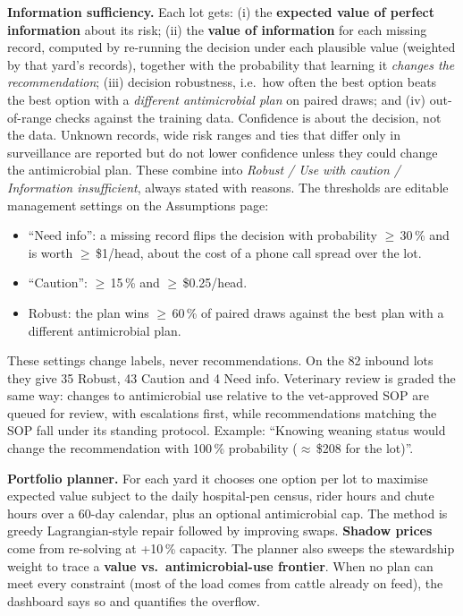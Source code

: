 \documentclass[10pt,letterpaper]{article}
\newcommand{\pct}{\,\%}
\newcommand{\usd}[1]{\$#1}
\newcommand{\lead}[1]{\textbf{#1}\enspace}
\begin{document}
\lead{Information sufficiency.} Each lot gets: (i) the \textbf{expected value of perfect information} about its risk; (ii) the \textbf{value of information} for each missing record, computed by re-running the decision under each plausible value (weighted by that yard's records), together with the probability that learning it \emph{changes the recommendation}; (iii) decision robustness, i.e.\ how often the best option beats the best option with a \emph{different antimicrobial plan} on paired draws; and (iv) out-of-range checks against the training data. Confidence is about the decision, not the data. Unknown records, wide risk ranges and ties that differ only in surveillance are reported but do not lower confidence unless they could change the antimicrobial plan. These combine into \emph{Robust / Use with caution / Information insufficient}, always stated with reasons. The thresholds are editable management settings on the Assumptions page:
\begin{itemize}
  \item ``Need info'': a missing record flips the decision with probability $\geq$\,30\pct{} and is worth $\geq$\,\usd{1}/head, about the cost of a phone call spread over the lot.
  \item ``Caution'': $\geq$\,15\pct{} and $\geq$\,\usd{0.25}/head.
  \item Robust: the plan wins $\geq$\,60\pct{} of paired draws against the best plan with a different antimicrobial plan.
\end{itemize}
These settings change labels, never recommendations. On the 82 inbound lots they give 35 Robust, 43 Caution and 4 Need info. Veterinary review is graded the same way: changes to antimicrobial use relative to the vet-approved SOP are queued for review, with escalations first, while recommendations matching the SOP fall under its standing protocol. Example: ``Knowing weaning status would change the recommendation with 100\pct{} probability ($\approx$\,\usd{208} for the lot)''.

\lead{Portfolio planner.} For each yard it chooses one option per lot to maximise expected value subject to the daily hospital-pen census, rider hours and chute hours over a 60-day calendar, plus an optional antimicrobial cap. The method is greedy Lagrangian-style repair followed by improving swaps. \textbf{Shadow prices} come from re-solving at +10\pct{} capacity. The planner also sweeps the stewardship weight to trace a \textbf{value vs.\ antimicrobial-use frontier}. When no plan can meet every constraint (most of the load comes from cattle already on feed), the dashboard says so and quantifies the overflow.
\end{document}
